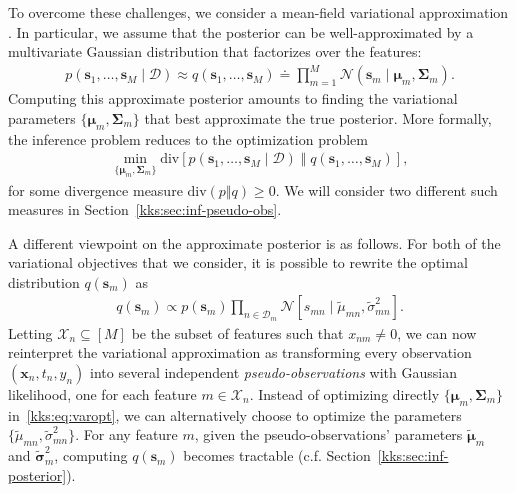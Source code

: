 To overcome these challenges, we consider a mean-field variational approximation \citep{wainwright2008graphical}.
In particular, we assume that the posterior can be well-approximated by a multivariate Gaussian distribution that factorizes over the features:
\begin{align}
\label{kks:eq:approxpost}
p(\bm{s}_1, \ldots, \bm{s}_M \mid \mathcal{D})
    \approx q(\bm{s}_1, \ldots, \bm{s}_M)
    \doteq \prod_{m = 1}^M \mathcal{N}(\bm{s}_m \mid \bm{\mu}_m, \bm{\Sigma}_m).
\end{align}
Computing this approximate posterior amounts to finding the variational parameters $\{\bm{\mu}_m, \bm{\Sigma}_m \}$ that best approximate the true posterior.
More formally, the inference problem reduces to the optimization problem
\begin{align}
\label{kks:eq:varopt}
\min_{\{\bm{\mu}_m, \bm{\Sigma}_m \}} \mathrm{div} \left[ p(\bm{s}_1, \ldots, \bm{s}_M \mid \mathcal{D}) \;\Vert\; q(\bm{s}_1, \ldots, \bm{s}_M) \right],
\end{align}
for some divergence measure $\mathrm{div}(p \Vert q) \ge 0$.
We will consider two different such measures in Section~\ref{kks:sec:inf-pseudo-obs}.

A different viewpoint on the approximate posterior is as follows.
For both of the variational objectives that we consider, it is possible to rewrite the optimal distribution $q(\bm{s}_m)$ as
\begin{align*}
q(\bm{s}_m) \propto p(\bm{s}_m) \prod_{n \in \mathcal{D}_m} \mathcal{N}[s_{mn} \mid \tilde{\mu}_{mn}, \tilde{\sigma}^2_{mn}].
\end{align*}
Letting $\mathcal{X}_n \subseteq [M]$ be the subset of features such that $x_{nm} \ne 0$, we can now reinterpret the variational approximation as transforming every observation $(\bm{x}_n, t_n, y_n)$ into several independent \emph{pseudo-observations} with Gaussian likelihood, one for each feature $m \in \mathcal{X}_n$.
Instead of optimizing directly $\{ \bm{\mu}_m, \bm{\Sigma}_m \}$ in~\eqref{kks:eq:varopt}, we can alternatively choose to optimize the parameters $\{ \tilde{\mu}_{mn}, \tilde{\sigma}^2_{mn} \}$.
For any feature $m$, given the pseudo-observations' parameters $\tilde{\bm{\mu}}_m$ and $\tilde{\bm{\sigma}}_m^2$, computing $q(\bm{s}_m)$ becomes tractable (c.f. Section~\ref{kks:sec:inf-posterior}).

